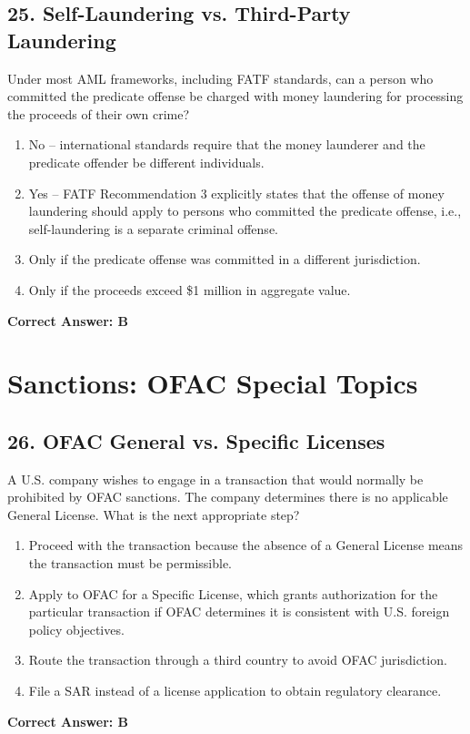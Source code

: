\documentclass[11pt,a4paper]{article}
\begin{document}
	\subsection{25. Self-Laundering vs. Third-Party Laundering}
	Under most AML frameworks, including FATF standards, can a person who committed the predicate offense be charged with money laundering for processing the proceeds of their own crime?
	\begin{enumerate}[label=\Alph*.]
		\item No -- international standards require that the money launderer and the predicate offender be different individuals.
		\item Yes -- FATF Recommendation 3 explicitly states that the offense of money laundering should apply to persons who committed the predicate offense, i.e., self-laundering is a separate criminal offense.
		\item Only if the predicate offense was committed in a different jurisdiction.
		\item Only if the proceeds exceed \$1 million in aggregate value.
	\end{enumerate}
	\textbf{Correct Answer: B}
	
	\section{Sanctions: OFAC Special Topics}
	
	\subsection{26. OFAC General vs. Specific Licenses}
	A U.S. company wishes to engage in a transaction that would normally be prohibited by OFAC sanctions. The company determines there is no applicable General License. What is the next appropriate step?
	\begin{enumerate}[label=\Alph*.]
		\item Proceed with the transaction because the absence of a General License means the transaction must be permissible.
		\item Apply to OFAC for a Specific License, which grants authorization for the particular transaction if OFAC determines it is consistent with U.S. foreign policy objectives.
		\item Route the transaction through a third country to avoid OFAC jurisdiction.
		\item File a SAR instead of a license application to obtain regulatory clearance.
	\end{enumerate}
	\textbf{Correct Answer: B}
	
\end{document}
